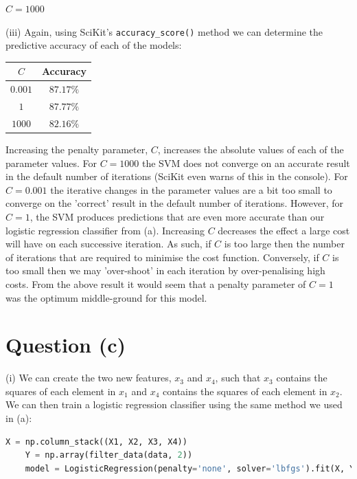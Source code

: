 \documentclass[12pt]{article}
\begin{document}
\begin{center}
    $C = 1000$
    
\end{center}

\noindent (iii) Again, using SciKit's \texttt{accuracy\_score()} method we can determine the predictive accuracy of each of the models:

\begin{center}
    \begin{tabular}{|c|c|}
        \hline
        $C$ & Accuracy \\
        \hline
        $0.001$ & $87.17\%$ \\
        $1$ & $87.77\%$ \\
        $1000$ & $82.16\%$ \\
        \hline
    \end{tabular}
\end{center}

Increasing the penalty parameter, $C$, increases the absolute values of each of the parameter values. For $C = 1000$ the SVM does not converge on an accurate result in the default number of iterations (SciKit even warns of this in the console). For $C = 0.001$ the iterative changes in the parameter values are a bit too small to converge on the 'correct' result in the default number of iterations. However, for $C = 1$, the SVM produces predictions that are even more accurate than our logistic regression classifier from (a). Increasing $C$ decreases the effect a large cost will have on each successive iteration. As such, if $C$ is too large then the number of iterations that are required to minimise the cost function. Conversely, if $C$ is too small then we may 'over-shoot' in each iteration by over-penalising high costs. From the above result it would seem that a penalty parameter of $C = 1$ was the optimum middle-ground for this model.

\section*{Question (c)}

\noindent (i) We can create the two new features, $x_3$ and $x_4$, such that $x_3$ contains the squares of each element in $x_1$ and $x_4$ contains the squares of each element in $x_2$. We can then train a logistic regression classifier using the same method we used in (a):

\begin{center}
    \lstset{basicstyle=\footnotesize}
    \begin{lstlisting}[language=Python]
    X = np.column_stack((X1, X2, X3, X4))
    Y = np.array(filter_data(data, 2))
    model = LogisticRegression(penalty='none', solver='lbfgs').fit(X, Y)
    \end{lstlisting}
\end{center}
\end{document}

